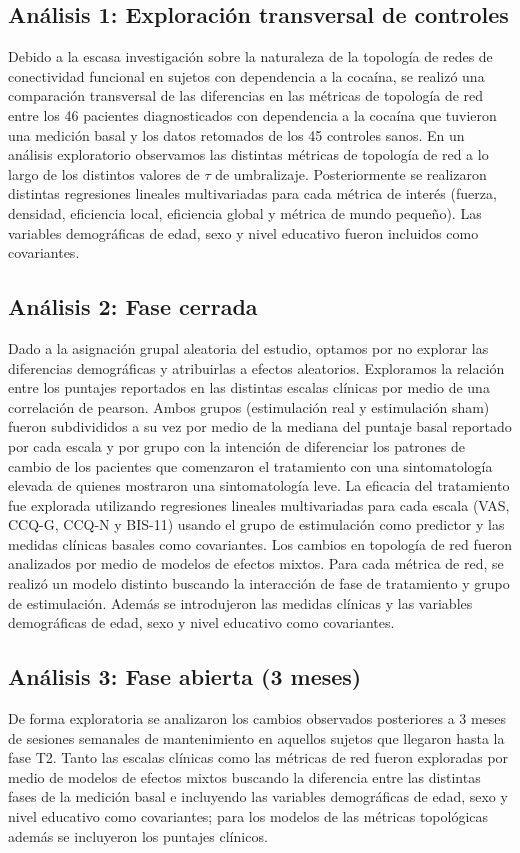 \subsection{Análisis 1: Exploración transversal de controles}
Debido a la escasa investigación sobre la naturaleza de la topología de redes de conectividad funcional en sujetos con dependencia a la cocaína, se realizó una comparación transversal de las diferencias en las métricas de topología de red entre los 46 pacientes diagnosticados con dependencia a la cocaína que tuvieron una medición basal y los datos retomados de los 45 controles sanos.
En un análisis exploratorio observamos las distintas métricas de topología de red a lo largo de los distintos valores de $\tau$ de umbralizaje. Posteriormente se realizaron distintas regresiones lineales multivariadas para cada métrica de interés (fuerza, densidad, eficiencia local, eficiencia global y métrica de mundo pequeño). Las variables demográficas de edad, sexo y nivel educativo fueron incluidos como covariantes.

\subsection{Análisis 2: Fase cerrada}
Dado a la asignación grupal aleatoria del estudio, optamos por no explorar las diferencias demográficas y atribuirlas a efectos aleatorios.
Exploramos la relación entre los puntajes reportados en las distintas escalas clínicas por medio de una correlación de pearson.
Ambos grupos (estimulación real y estimulación sham) fueron subdivididos a su vez por medio de la mediana del puntaje basal reportado por cada escala y por grupo con la intención de diferenciar los patrones de cambio de los pacientes que comenzaron el tratamiento con una sintomatología elevada de quienes mostraron una sintomatología leve.
La eficacia del tratamiento fue explorada utilizando regresiones lineales multivariadas para cada escala (VAS, CCQ-G, CCQ-N y BIS-11) usando el grupo de estimulación como predictor y las medidas clínicas basales como covariantes.
Los cambios en topología de red fueron analizados por medio de modelos de efectos mixtos. Para cada métrica de red, se realizó un modelo distinto buscando la interacción de fase de tratamiento y grupo de estimulación. Además se introdujeron las medidas clínicas y las variables demográficas de edad, sexo y nivel educativo como covariantes.

\subsection{Análisis 3: Fase abierta (3 meses)}
De forma exploratoria se analizaron los cambios observados posteriores a 3 meses de sesiones semanales de mantenimiento en aquellos sujetos que llegaron hasta la fase T2.
Tanto las escalas clínicas como las métricas de red fueron exploradas por medio de modelos de efectos mixtos buscando la diferencia entre las distintas fases de la medición basal e incluyendo las variables demográficas de edad, sexo y nivel educativo como covariantes; para los modelos de las métricas topológicas además se incluyeron los puntajes clínicos.

